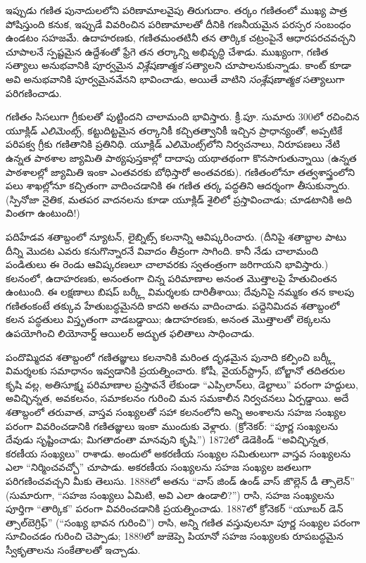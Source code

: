 \documentclass[../../../include/open-logic-section]{subfiles}
\begin{document}
ఇప్పుడు గణిత పునాదులలోని పరిణామాలవైపు తిరుగుదాం. తర్కం గణితంలో ముఖ్య పాత్ర
పోషిస్తుంది కనుక, ఇప్పుడే వివరించిన పరిణామాలతో దీనికి గణనీయమైన పరస్పర సంబంధం
ఉండటం సహజమే. ఉదాహరణకు, గణితమంతటినీ తన తార్కిక చట్రంపైనే ఆధారపరచవచ్చని
చూపాలనే స్పష్టమైన ఉద్దేశంతో ఫ్రేగె తన తర్కాన్ని అభివృద్ధి చేశాడు. ముఖ్యంగా,
గణిత సత్యాలు అనుభవానికి పూర్వమైన \emph{విశ్లేషణాత్మక} సత్యాలని చూపాలనుకున్నాడు.
కాంట్ కూడా అవి అనుభవానికి పూర్వమైనవేనని భావించాడు, అయితే వాటిని
\emph{సంశ్లేషణాత్మక} సత్యాలుగా పరిగణించాడు.

గణితం సిసలుగా గ్రీకులతో పుట్టిందని చాలామంది భావిస్తారు. క్రీ.పూ. సుమారు 300లో
రచించిన యూక్లిడ్ \emph{ఎలిమెంట్స్}, కట్టుదిట్టమైన తర్కానికీ కచ్చితత్వానికీ ఇచ్చిన ప్రాధాన్యంతో,
అప్పటికే పరిపక్వ గ్రీకు గణితానికి ప్రతినిధి. యూక్లిడ్ \emph{ఎలిమెంట్స్}లోని
నిర్వచనాలు, నిరూపణలు నేటి ఉన్నత పాఠశాల జ్యామితి పాఠ్యపుస్తకాల్లో దాదాపు యథాతథంగా
కొనసాగుతున్నాయి (ఉన్నత పాఠశాలల్లో జ్యామితి ఇంకా ఎంతవరకు బోధిస్తారో అంతవరకు).
గణితంలోనూ తత్వశాస్త్రంలోని పలు శాఖల్లోనూ కచ్చితంగా వాదించడానికి ఈ గణిత
తర్క పద్ధతిని ఆదర్శంగా తీసుకున్నారు. (స్పినోజా నైతిక, మతపర వాదనలను కూడా యూక్లిడ్ శైలిలో
ప్రస్తావించాడు; చూడటానికి అది వింతగా ఉంటుంది!)

పదిహేడవ శతాబ్దంలో న్యూటన్, లైబ్నిట్స్ కలనాన్ని ఆవిష్కరించారు. (దీనిపై శతాబ్దాల
పాటు దీన్ని మొదట ఎవరు కనుగొన్నారనే వివాదం తీవ్రంగా సాగింది. కానీ నేడు చాలామంది పండితులు ఈ రెండు
ఆవిష్కరణలూ చాలావరకు స్వతంత్రంగా జరిగాయని భావిస్తారు.) కలనంలో, ఉదాహరణకు, అనంతంగా
చిన్న పరిమాణాల అనంత మొత్తాలపై హేతుచింతన ఉంటుంది. ఈ లక్షణాలు బిషప్ బర్క్లీ
విమర్శలకు దారితీశాయి; దేవునిపై నమ్మకం తన కాలపు గణితంకంటే తక్కువ హేతుబద్ధమైనది
కాదని అతను వాదించాడు. పద్దెనిమిదవ శతాబ్దంలో కలన పద్ధతులు విస్తృతంగా వాడబడ్డాయి;
ఉదాహరణకు, అనంత మొత్తాలతో లెక్కలను ఉపయోగించి లియోనార్డ్ ఆయిలర్ అద్భుత ఫలితాలు
సాధించాడు.

పందొమ్మిదవ శతాబ్దంలో గణితజ్ఞులు కలనానికి మరింత దృఢమైన పునాది కల్పించి బర్క్లీ
విమర్శలకు సమాధానం ఇవ్వడానికి ప్రయత్నించారు. కోషీ, వైయర్‌స్ట్రాస్, బోల్జానో
తదితరుల కృషి వల్ల, అతిసూక్ష్మ పరిమాణాల ప్రస్తావనే లేకుండా ``ఎప్సిలాన్‌లు,
డెల్టాలు'' పరంగా హద్దులు, అవిచ్ఛిన్నత, అవకలనం, సమాకలనం గురించి మన సమకాలీన
నిర్వచనలు ఏర్పడ్డాయి. అదే శతాబ్దంలో తరువాత, వాస్తవ సంఖ్యలతో సహా కలనంలోని అన్ని
అంశాలను సహజ సంఖ్యల పరంగా వివరించడానికి గణితజ్ఞులు ఇంకా ముందుకు వెళ్లారు.
(క్రోనెకర్: ``పూర్ణ సంఖ్యలను దేవుడు సృష్టించాడు; మిగతాదంతా మానవుని కృషి.'')
1872లో డెడెకిండ్ ``అవిచ్ఛిన్నత, కరణీయ సంఖ్యలు'' రాశాడు. అందులో అకరణీయ
సంఖ్యల సమితులుగా వాస్తవ సంఖ్యలను ఎలా ``నిర్మించవచ్చో'' చూపాడు. అకరణీయ
సంఖ్యలను సహజ సంఖ్యల జతలుగా పరిగణించవచ్చని మీకు తెలుసు. 1888లో అతను ``వాస్ జిండ్ ఉండ్ వాస్ జొల్లెన్ డీ
త్సాలెన్'' (సుమారుగా, ``సహజ సంఖ్యలు ఏమిటి, అవి ఎలా ఉండాలి?'') రాసి, సహజ
సంఖ్యలను పూర్తిగా ``తార్కిక'' పరంగా వివరించడానికి ప్రయత్నించాడు. 1887లో
క్రోనెకర్ ``యూబర్ డెన్ త్సాల్‌బెగ్రిఫ్'' (``సంఖ్య భావన గురించి'') రాసి, అన్ని
గణిత వస్తువులనూ పూర్ణ సంఖ్యల పరంగా సూచించడం గురించి చెప్పాడు; 1889లో జుజెప్పె
పియానో సహజ సంఖ్యలకు రూపబద్ధమైన స్వీకృతాలను సంకేతాలతో ఇచ్చాడు.
\end{document}
